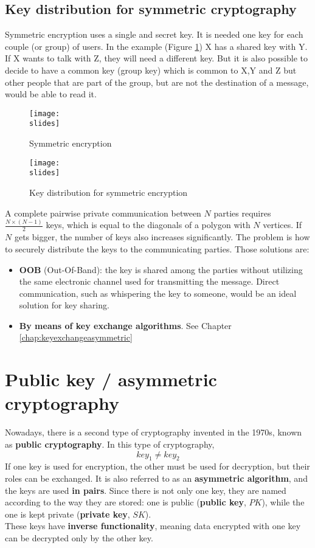 \subsection{Key distribution for symmetric cryptography}
Symmetric  encryption uses a single and secret
key. It is needed one key for each couple (or
group) of users. In the example (Figure \ref*{fig:symmenc}) X has a shared
key with Y. If X wants to talk with Z, they will
need a different key. But it is also possible to
decide to have a common key (group key)
which is common to X,Y and Z but other people
that are part of the group, but are not the
destination of a message, would be able to read
it.
\begin{figure}[h]
    \centering
    \texttt{[image: \\slides]}
    \caption{Symmetric encryption}
    \label{fig:symmenc}
\end{figure}

\begin{figure}[h]
    \centering
    \texttt{[image: \\slides]}
    \caption{Key distribution for symmetric encryption}
    \label{fig:keydistributipmsym}
\end{figure}

A complete pairwise private communication between \(N\) parties requires \(\frac{N \times (N-1)}{2}\) keys, which is equal to the diagonals of a polygon with \(N\) vertices. If \(N\) gets bigger, the number of keys also increases significantly. The problem is how to securely distribute the keys to the communicating parties.
Those solutions are:
\begin{itemize}
    \item \textbf{OOB} (Out-Of-Band): the key is shared among the parties without utilizing the same electronic channel used for transmitting the message. Direct communication, such as whispering the key to someone, would be an ideal solution for key sharing.
    \item \textbf{By means of key exchange algorithms}. See Chapter \ref{chap:keyexchangeasymmetric}
\end{itemize}

\newpage
\section{Public key / asymmetric cryptography}

Nowadays, there is a second type of cryptography invented in the 1970s, known as \textbf{public cryptography}. In this type of cryptography, \[key_1 \neq key_2\]
If one key is used for encryption, the other must be used for decryption, but their roles can be exchanged.
It is also referred to as an \textbf{asymmetric algorithm}, and the keys are used \textbf{in pairs}. Since there is not only one key, they are named according to the way they are stored: one is public (\textbf{public key}, $PK$), while the one is kept private (\textbf{private key}, $SK$). \\
These keys have \textbf{inverse functionality}, meaning data encrypted with one key can be decrypted only by the other key.

